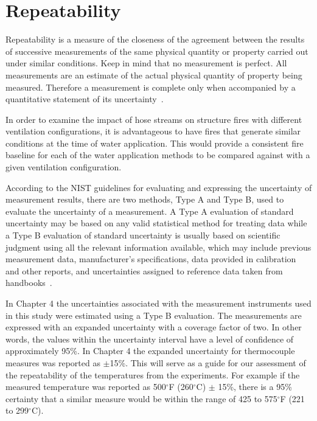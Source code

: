 \documentclass[12pt,oneside]{book}
\begin{document}
\section{Repeatability}

Repeatability is a measure of the closeness of the agreement between the results of successive measurements of the same physical quantity or property carried out under similar conditions. Keep in mind that no measurement is perfect.  All measurements are an estimate of the actual physical quantity of property being measured. Therefore a measurement is complete only when accompanied by a quantitative statement of its uncertainty~\cite{Taylor&Kuyatt:1994}. 

In order to examine the impact of hose streams on structure fires with different ventilation configurations, it is advantageous to have fires that generate similar conditions at the time of water application.  This would provide a consistent fire baseline for each of the water application methods to be compared against with a given ventilation configuration.

According to the NIST guidelines for evaluating and expressing the uncertainty of measurement results, there are two methods, Type A and Type B, used to evaluate the uncertainty of a measurement.  A Type A evaluation of standard uncertainty may be based on any valid statistical method for treating data while a Type B evaluation of standard uncertainty is usually based on scientific judgment using all the relevant information available, which may include previous measurement data, manufacturer's specifications, data provided in calibration and other reports, and uncertainties assigned to reference data taken from handbooks~\cite{Taylor&Kuyatt:1994}.     

In Chapter 4 the uncertainties associated with the measurement instruments used in this study were estimated using a Type B evaluation. The measurements are expressed with an expanded uncertainty with a coverage factor of two.  In other words, the values within the uncertainty interval have a level of confidence of approximately 95\%.  In Chapter 4 the expanded uncertainty for thermocouple measures was reported as $\pm$15\%. This will serve as a guide for our assessment of the repeatability of the temperatures from the experiments. For example if the measured temperature was reported as 500$^\circ$F (260$^\circ$C) $\pm$ 15\%, there is a 95\% certainty that a similar measure would be within the range of 425 to 575$^\circ$F (221 to 299$^\circ$C).  
\end{document}

